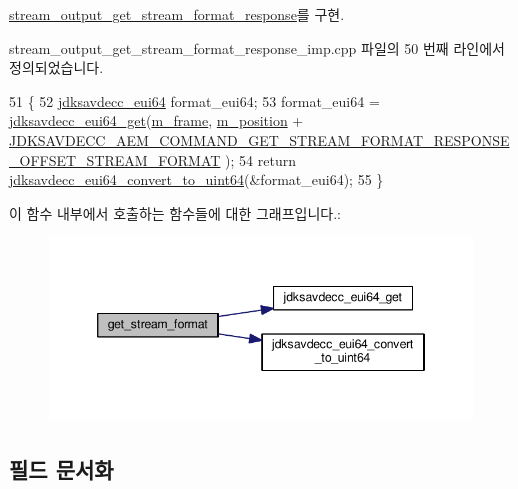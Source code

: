 \hyperlink{classavdecc__lib_1_1stream__output__get__stream__format__response_aba7b3a3a06d9c53ef54e43787fa46a7a}{stream\+\_\+output\+\_\+get\+\_\+stream\+\_\+format\+\_\+response}를 구현.



stream\+\_\+output\+\_\+get\+\_\+stream\+\_\+format\+\_\+response\+\_\+imp.\+cpp 파일의 50 번째 라인에서 정의되었습니다.


\begin{DoxyCode}
51 \{
52     \hyperlink{structjdksavdecc__eui64}{jdksavdecc\_eui64} format\_eui64;
53     format\_eui64 = \hyperlink{group__eui64_ga2652311a25a6b91cddbed75c108c7031}{jdksavdecc\_eui64\_get}(\hyperlink{classavdecc__lib_1_1stream__output__get__stream__format__response__imp_a50417969cf438e7c8d698726bbbe2ff9}{m\_frame}, 
      \hyperlink{classavdecc__lib_1_1stream__output__get__stream__format__response__imp_af5e691c4a8a0feb07f48440b321206cd}{m\_position} + 
      \hyperlink{group__command__get__stream__format__response_ga7c39f9ec657a6331b5b12a126dc02a1e}{JDKSAVDECC\_AEM\_COMMAND\_GET\_STREAM\_FORMAT\_RESPONSE\_OFFSET\_STREAM\_FORMAT}
      );
54     \textcolor{keywordflow}{return} \hyperlink{group__eui64_ga1c9a3634faa4bec90dea5a52e691bf63}{jdksavdecc\_eui64\_convert\_to\_uint64}(&format\_eui64);
55 \}
\end{DoxyCode}


이 함수 내부에서 호출하는 함수들에 대한 그래프입니다.\+:
\nopagebreak
\begin{figure}[H]
\begin{center}
\leavevmode
\includegraphics[width=346pt]{classavdecc__lib_1_1stream__output__get__stream__format__response__imp_a853524daa61b51c7cba18fbb01bc078e_cgraph}
\end{center}
\end{figure}




\subsection{필드 문서화}
